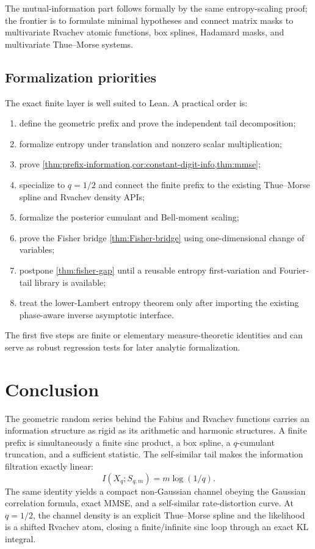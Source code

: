\documentclass[11pt,oneside]{article}
\theoremstyle{definition}
\theoremstyle{remark}
\begin{document}
The mutual-information part follows formally by the same entropy-scaling proof;
the frontier is to formulate minimal hypotheses and connect matrix masks to
multivariate Rvachev atomic functions, box splines, Hadamard masks, and
multivariate Thue--Morse systems.

\subsection{Formalization priorities}

The exact finite layer is well suited to Lean.  A practical order is:
\begin{enumerate}
\item define the geometric prefix and prove the independent tail decomposition;
\item formalize entropy under translation and nonzero scalar multiplication;
\item prove \cref{thm:prefix-information,cor:constant-digit-info,thm:mmse};
\item specialize to $q=1/2$ and connect the finite prefix to the existing
      Thue--Morse spline and Rvachev density APIs;
\item formalize the posterior cumulant and Bell-moment scaling;
\item prove the Fisher bridge \cref{thm:Fisher-bridge} using one-dimensional
      change of variables;
\item postpone \cref{thm:fisher-gap} until a reusable entropy first-variation and
      Fourier-tail library is available;
\item treat the lower-Lambert entropy theorem only after importing the existing
      phase-aware inverse asymptotic interface.
\end{enumerate}
The first five steps are finite or elementary measure-theoretic identities and can
serve as robust regression tests for later analytic formalization.

\section{Conclusion}
\label{sec:conclusion}

The geometric random series behind the Fabius and Rvachev functions carries an
information structure as rigid as its arithmetic and harmonic structures.  A
finite prefix is simultaneously a finite sinc product, a box spline, a
$q$-cumulant truncation, and a sufficient statistic.  The self-similar tail makes
the information filtration exactly linear:
\[
 I(X_q;S_{q,m})=m\log(1/q).
\]
The same identity yields a compact non-Gaussian channel obeying the Gaussian
correlation formula, exact MMSE, and a self-similar rate-distortion curve.
At $q=1/2$, the channel density is an explicit Thue--Morse spline and the
likelihood is a shifted Rvachev atom, closing a finite/infinite sinc loop through
an exact KL integral.
\end{document}

